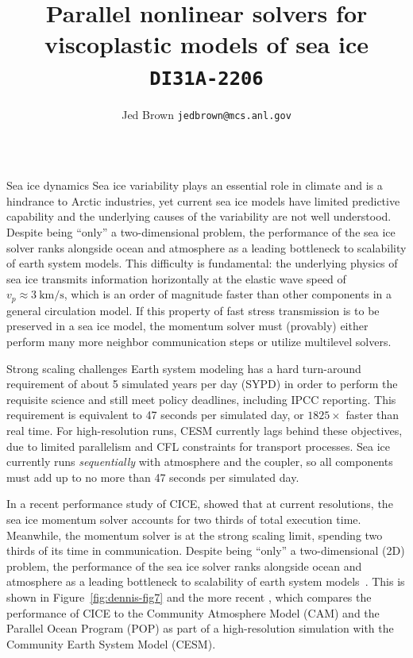 \documentclass[final,t]{beamer}
\title{\huge Parallel nonlinear solvers for viscoplastic models of sea ice {\normalsize \texttt{DI31A-2206}}}
\author[Jed Brown]{Jed Brown {\texttt{jedbrown@mcs.anl.gov}}}
\institute[MCS]{Download this poster from \url{http://59A2.org/files/201312-AGUSeaIce.pdf}}
\newcommand\citet[1]{\cite{#1}}
\newcommand\citep[1]{\cite{#1}}
\begin{document}
\begin{frame}{} 
  \vspace{-3em}
  \begin{columns}
    \begin{column}{0.31\textwidth}
      \begin{block}{Sea ice dynamics}
         Sea ice variability plays an essential role in climate and is a hindrance to Arctic industries, yet current sea ice models have limited predictive capability and the underlying causes of the variability are not well understood.
         Despite being ``only'' a two-dimensional problem, the performance of the sea ice solver ranks alongside ocean and atmosphere as a leading bottleneck to scalability of earth system models.
         This difficulty is fundamental: the underlying physics of sea ice transmits information horizontally at the elastic wave speed of $v_p \approx \SI{3}{\kilo\metre\per\second}$, which is an order of magnitude faster than other components in a general circulation model.
         If this property of fast stress transmission is to be preserved in a sea ice model, the momentum solver must (provably) either perform many more neighbor communication steps or utilize multilevel solvers.
       \end{block}
       
      \begin{block}{Strong scaling challenges}
        Earth system modeling has a hard turn-around requirement of about 5 simulated years per day (SYPD) in order to perform the requisite science and still meet policy deadlines, including IPCC reporting.
        This requirement is equivalent to 47 seconds per simulated day, or $1825\times$ faster than real time.
        For high-resolution runs, CESM currently lags behind these objectives, due to limited parallelism and CFL constraints for transport processes.
        Sea ice currently runs \emph{sequentially} with atmosphere and the coupler, so all components must add up to no more than 47 seconds per simulated day.

        In a recent performance study of CICE, \citet{luecke2012performance} showed that at current resolutions, the sea ice momentum solver accounts for two thirds of total execution time.
        Meanwhile, the momentum solver is at the strong scaling limit, spending two thirds of its time in communication.
        Despite being ``only'' a two-dimensional (2D) problem, the performance of the sea ice solver ranks alongside ocean and atmosphere as a leading bottleneck to scalability of earth system models~\citep{dennis2012computational}.
        This is shown in Figure~\ref{fig:dennis-fig7} and the more recent \label{fig:cesm-scaling}, which compares the performance of CICE to the Community Atmosphere Model (CAM) and the Parallel Ocean Program (POP) as part of a high-resolution simulation with the Community Earth System Model (CESM).


\end{block}
\end{column}
\end{columns}
\end{frame}
\end{document}
